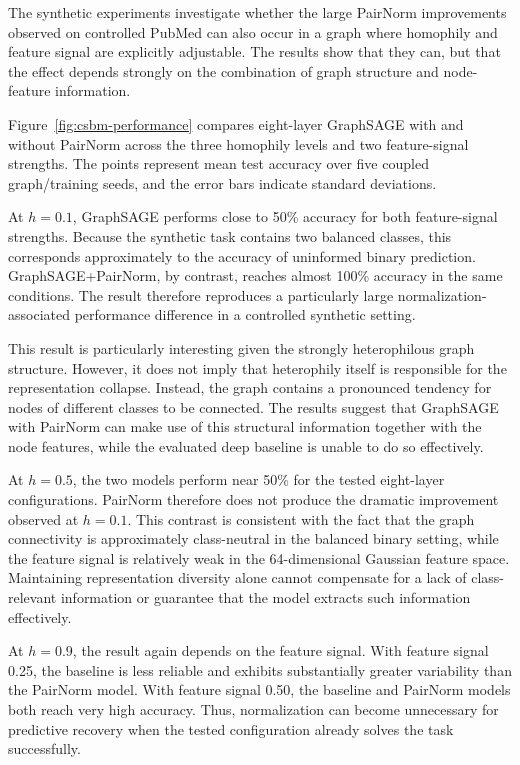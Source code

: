 \documentclass[english]{lni}
\begin{document}
The synthetic experiments investigate whether the large PairNorm improvements observed on controlled PubMed can also occur in a graph where homophily and feature signal are explicitly adjustable. The results show that they can, but that the effect depends strongly on the combination of graph structure and node-feature information.

Figure~\ref{fig:csbm-performance} compares eight-layer GraphSAGE with and without PairNorm across the three homophily levels and two feature-signal strengths. The points represent mean test accuracy over five coupled graph/training seeds, and the error bars indicate standard deviations.

At $h=0.1$, GraphSAGE performs close to 50\% accuracy for both feature-signal strengths. Because the synthetic task contains two balanced classes, this corresponds approximately to the accuracy of uninformed binary prediction. GraphSAGE+PairNorm, by contrast, reaches almost 100\% accuracy in the same conditions. The result therefore reproduces a particularly large normalization-associated performance difference in a controlled synthetic setting.

This result is particularly interesting given the strongly heterophilous graph structure. However, it does not imply that heterophily itself is responsible for the representation collapse. Instead, the graph contains a pronounced tendency for nodes of different classes to be connected. The results suggest that GraphSAGE with PairNorm can make use of this structural information together with the node features, while the evaluated deep baseline is unable to do so effectively.

At $h=0.5$, the two models perform near 50\% for the tested eight-layer configurations. PairNorm therefore does not produce the dramatic improvement observed at $h=0.1$. This contrast is consistent with the fact that the graph connectivity is approximately class-neutral in the balanced binary setting, while the feature signal is relatively weak in the 64-dimensional Gaussian feature space. Maintaining representation diversity alone cannot compensate for a lack of class-relevant information or guarantee that the model extracts such information effectively.

At $h=0.9$, the result again depends on the feature signal. With feature signal 0.25, the baseline is less reliable and exhibits substantially greater variability than the PairNorm model. With feature signal 0.50, the baseline and PairNorm models both reach very high accuracy. Thus, normalization can become unnecessary for predictive recovery when the tested configuration already solves the task successfully.
\end{document}
